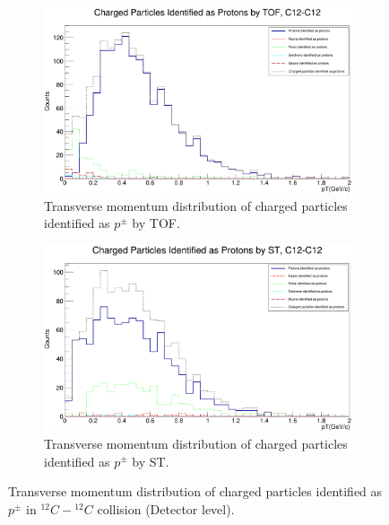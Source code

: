 \documentclass[12pt, twocolumn]{article}
\begin{document}
\begin{figure}[h]
\centering
\begin{subfigure}[h]{0.49\textwidth}
\centering
\includegraphics[scale=0.14]{Detector_pT_protons(tof)_C12.png}
\caption{Transverse momentum distribution of charged particles identified as $p^{\pm}$ by TOF.}
\label{Detector - Transverse momentum distribution of protons (TOF) C12.}
\end{subfigure}
\hfill
\begin{subfigure}[h]{0.49\textwidth}
\centering
\includegraphics[scale=0.14]{Detector_pT_protons(st)_C12.png}
\caption{Transverse momentum distribution of charged particles identified as $p^{\pm}$ by ST.}
\label{Detector - Transverse momentum distribution of protons (ST) C12.}
\end{subfigure}
\caption{Transverse momentum distribution of charged particles identified as $p^{\pm}$ in $^{12}C-{^{12}C}$ collision (Detector level).}
\label{Transverse momentum distribution of charged particles identified as protons in C12-C12 collision.}
\end{figure}
\end{document}
